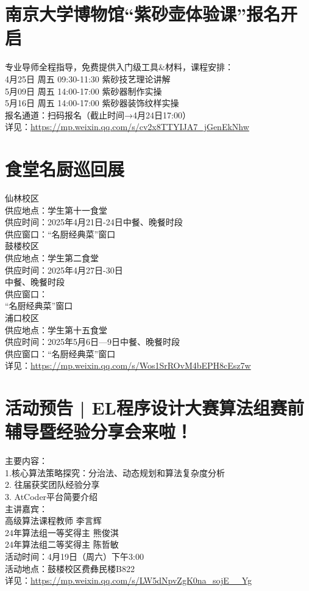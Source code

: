 \documentclass[letterpaper, 12pt]{article}
\begin{document}
\begin{multicols}{2}
\section{南京大学博物馆“紫砂壶体验课”报名开启}
专业导师全程指导，免费提供入门级工具\&材料，课程安排：
\\4月25日 周五 09:30-11:30 紫砂技艺理论讲解
\\5月09日 周五 14:00-17:00 紫砂器制作实操
\\5月16日 周五 14:00-17:00 紫砂器装饰纹样实操
\\报名通道：扫码报名（截止时间→4月24日17:00）
\\详见：\url{https://mp.weixin.qq.com/s/cv2x8TTYIJA7_jGenEkNhw}

\section{食堂名厨巡回展}
仙林校区
\\供应地点：学生第十一食堂
\\供应时间：2025年4月21日-24日中餐、晚餐时段
\\供应窗口：“名厨经典菜”窗口
\\鼓楼校区
\\供应地点：学生第二食堂
\\供应时间：2025年4月27日-30日
\\中餐、晚餐时段
\\供应窗口：
\\“名厨经典菜”窗口
\\浦口校区
\\供应地点：学生第十五食堂
\\供应时间：2025年5月6日—9日中餐、晚餐时段
\\供应窗口：“名厨经典菜”窗口
\\详见：\url{https://mp.weixin.qq.com/s/Wos1SrROvM4bEPH8cEsz7w}

\section{活动预告 | EL程序设计大赛算法组赛前辅导暨经验分享会来啦！}
主要内容：
\\1.核心算法策略探究：分治法、动态规划和算法复杂度分析
\\2. 往届获奖团队经验分享
\\3. AtCoder平台简要介绍
\\主讲嘉宾：
\\高级算法课程教师 李言辉
\\24年算法组一等奖得主 熊俊淇
\\24年算法组二等奖得主 陈哲敏
\\活动时间：4月19日（周六）下午3:00
\\活动地点：鼓楼校区费彝民楼B822
\\详见：\url{https://mp.weixin.qq.com/s/LW5dNpvZgK0na_sojE__Yg}


\end{multicols}
\end{document}
